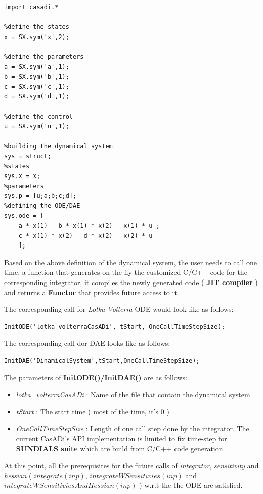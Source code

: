 \documentclass[12pt, letterpaper]{article}
\begin{document}
\begin{lstlisting}
import casadi.*

%define the states
x = SX.sym('x',2);

%define the parameters
a = SX.sym('a',1);
b = SX.sym('b',1);
c = SX.sym('c',1);
d = SX.sym('d',1);

%define the control
u = SX.sym('u',1);

%building the dynamical system
sys = struct;
%states
sys.x = x;
%parameters
sys.p = [u;a;b;c;d];
%defining the ODE/DAE
sys.ode = [ 
    a * x(1) - b * x(1) * x(2) - x(1) * u ; 
    c * x(1) * x(2) - d * x(2) - x(2) * u 
    ];
\end{lstlisting}

Based on the above definition of the dynamical system, the user needs to call one time, a function that generates on the fly the customized C/C++ code for the corresponding integrator, it compiles the newly generated code ( \textbf{JIT compiler} ) and returns a \textbf{Functor} that provides future access to it.

The corresponding call for \textit{Lotka-Volterra} ODE would look like as follows:

\begin{lstlisting}
InitODE('lotka_volterraCasADi', tStart, OneCallTimeStepSize);
\end{lstlisting}

The corresponding call dor DAE looks like as follows:
\begin{lstlisting}
InitDAE('DinamicalSystem',tStart,OneCallTimeStepSize);
\end{lstlisting}

The parameters of \textbf{InitODE()/InitDAE()} are as follows: 

\begin{itemize}
	\item \textit{lotka\_volterraCasADi} : Name of the file that contain the dynamical system
	\item \textit{tStart} : The start time ( most of the time, it's $0$ )
	\item \textit{OneCallTimeStepSize} : Length of one call step done by the integrator. The current CasADi's API implementation is limited to fix time-step for \textbf{SUNDIALS suite} which are build from C/C++ code generation.
\end{itemize}
At this point, all the prerequisites for the future calls of \textit{integrator}, \textit{sensitivity} and \textit{hessian} ( $integrate(inp)$, $integrateWSensitivies(inp)$ and \\ $integrateWSensitiviesAndHessian(inp)$ ) w.r.t the the ODE are satisfied. 
\end{document}
